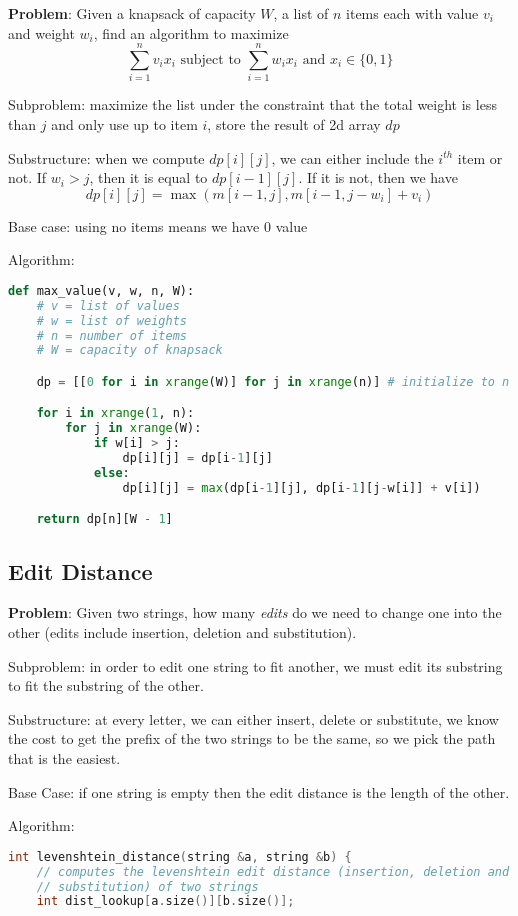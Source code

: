 \documentclass[12 pt, twoside] {article}
\begin{document}
{\textbf{Problem}: Given a knapsack of capacity $W$, a list of $n$ items each with
value $v_i$ and weight $w_i$, find an algorithm to maximize
\[
    \sum_{i=1}^n v_i x_i \text{ subject to } \sum_{i=1}^n w_i x_i \text{ and } x_i \in \{0, 1\}
\]

Subproblem: maximize the list under the constraint that the total weight is less
than $j$ and only use up to item $i$, store the result of 2d array $dp$

Substructure: when we compute $dp[i][j]$, we can either include the $i^{th}$ item
or not. If $w_i > j$, then it is equal to $dp[i-1][j]$. If it is not, then we
have
\[
    dp[i][j] = \max(m[i-1, j], m[i-1, j-w_i] + v_i)
\]

Base case: using no items means we have 0 value

Algorithm:
\begin{lstlisting}[language=Python]
def max_value(v, w, n, W):
    # v = list of values
    # w = list of weights
    # n = number of items
    # W = capacity of knapsack

    dp = [[0 for i in xrange(W)] for j in xrange(n)] # initialize to n x W

    for i in xrange(1, n):
        for j in xrange(W):
            if w[i] > j:
                dp[i][j] = dp[i-1][j]
            else:
                dp[i][j] = max(dp[i-1][j], dp[i-1][j-w[i]] + v[i])

    return dp[n][W - 1]
\end{lstlisting}

\subsection*{Edit Distance}

\textbf{Problem}: Given two strings, how many \textit{edits} do we need to
change one into the other (edits include insertion, deletion and substitution).

Subproblem: in order to edit one string to fit another, we must edit its
substring to fit the substring of the other.

Substructure: at every letter, we can either insert, delete or substitute, we
know the cost to get the prefix of the two strings to be the same, so we pick
the path that is the easiest.

Base Case: if one string is empty then the edit distance is the length of the
other.

Algorithm:
\begin{lstlisting}[language=C++]
int levenshtein_distance(string &a, string &b) {
    // computes the levenshtein edit distance (insertion, deletion and
    // substitution) of two strings
    int dist_lookup[a.size()][b.size()];


\end{lstlisting}}
\end{document}
